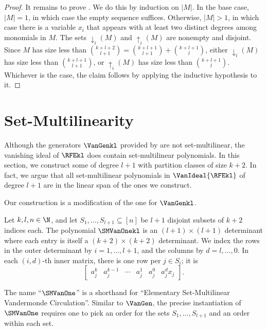 \documentclass{toc}
\begin{document}
\begin{proof}
  \medskip

  It remains to prove .
  We do this by induction on \(|{M}|\).
  In the base case, \(|{M}| = 1\), in which case the empty
  sequence suffices.
  Otherwise, \(|{M}| > 1\), in which case there is a variable
  \(x_i\) that appears with at least two distinct degrees among monomials in
  \({M}\).
  The sets \({\downarrow_i}({M})\) and \({\uparrow_i}({M})\) are
  nonempty and disjoint.
  Since \({M}\) has size less than
  \(\binom{k+l+2}{l+1} = \binom{k+l+1}{l+1} + \binom{k+l+1}{l}\),
  either \({\downarrow_i}({M})\) has size less than
  \(\binom{k+l+1}{l+1}\),
  or \({\uparrow_i}({M})\) has size less than \(\binom{k+l+1}{l}\).
  Whichever is the case, the claim follows by applying the inductive
  hypothesis to it.
\end{proof}



\section{Set-Multilinearity}
\label{s.set-multiaffine}

Although the generators $\VanGenkl$ provided by
 are not set-multilinear,
the vanishing ideal of $\RFEkl$ does contain set-multilinear polynomials.
In this section,
we construct some of degree $l+1$ with partition classes of size $k+2$.
In fact, we argue that all set-multilinear polynomials in $\VanIdeal{\RFEkl}$
of degree $l+1$ are in the linear span of the ones we construct.

Our construction is a modification of the one for $\VanGenkl$.
\begin{definition}
  \label{def.smvan1}
  Let \(k,l,n \in \N\),
  and let \(S_1,\ldots,S_{l+1}\subseteq [n]\) be \(l+1\) disjoint
  subsets of \(k+2\) indices each.
  The polynomial \(\SMVanOnekl\) is an \((l+1)\times(l+1)\) determinant
  where each entry is itself a \((k+2)\times(k+2)\) determinant.
  We index the rows in the outer determinant by \(i=1,\ldots,l+1\),
  and the columns by \(d=l,\ldots,0\).
  In each \((i,d)\)-th inner matrix, there is one row per \(j\in S_i\); it is
  \[
    \begin{bmatrix}
        a_j^k & a_j^{k-1} & \cdots & a_j^1 & a_j^0 & a_j^d x_j
    \end{bmatrix}.
  \]
\end{definition}
\noindent
The name ``\(\SMVanOne\)'' is a shorthand for ``Elementary Set-Multilinear
Vandermonde Circulation''.
Similar to \(\VanGen\), the precise instantiation of \(\SMVanOne\)
requires one to pick an order for the sets \(S_1,\ldots,S_{l+1}\) and an order within each set. 
\end{document}
